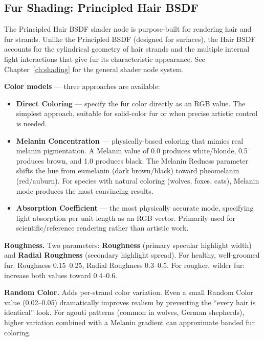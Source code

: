 \subsection{Fur Shading: Principled Hair BSDF}
\label{subsec:hair-bsdf}

The Principled Hair BSDF shader node is purpose-built for rendering hair and fur strands. Unlike the Principled BSDF (designed for surfaces), the Hair BSDF accounts for the cylindrical geometry of hair strands and the multiple internal light interactions that give fur its characteristic appearance. See Chapter~\ref{ch:shading} for the general shader node system.

\textbf{Color models} --- three approaches are available:

\begin{itemize}[leftmargin=2em]
  \item \textbf{Direct Coloring} --- specify the fur color directly as an RGB value. The simplest approach, suitable for solid-color fur or when precise artistic control is needed.

  \item \textbf{Melanin Concentration} --- physically-based coloring that mimics real melanin pigmentation. A Melanin value of 0.0 produces white/blonde, 0.5 produces brown, and 1.0 produces black. The Melanin Redness parameter shifts the hue from eumelanin (dark brown/black) toward pheomelanin (red/auburn). For species with natural coloring (wolves, foxes, cats), Melanin mode produces the most convincing results.

  \item \textbf{Absorption Coefficient} --- the most physically accurate mode, specifying light absorption per unit length as an RGB vector. Primarily used for scientific/reference rendering rather than artistic work.
\end{itemize}

\textbf{Roughness.} Two parameters: \textbf{Roughness} (primary specular highlight width) and \textbf{Radial Roughness} (secondary highlight spread). For healthy, well-groomed fur: Roughness 0.15--0.25, Radial Roughness 0.3--0.5. For rougher, wilder fur: increase both values toward 0.4--0.6.

\textbf{Random Color.} Adds per-strand color variation. Even a small Random Color value (0.02--0.05) dramatically improves realism by preventing the ``every hair is identical'' look. For agouti patterns (common in wolves, German shepherds), higher variation combined with a Melanin gradient can approximate banded fur coloring.

